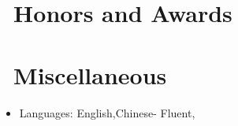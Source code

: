 \documentclass{resume}
\begin{document}
\section{\faHeartO\ Honors and Awards}

\section{\faInfo\ Miscellaneous}
\begin{itemize}[parsep=0.5ex]
  \item Languages: English,Chinese- Fluent, 
\end{itemize}

%
%
\end{document}
